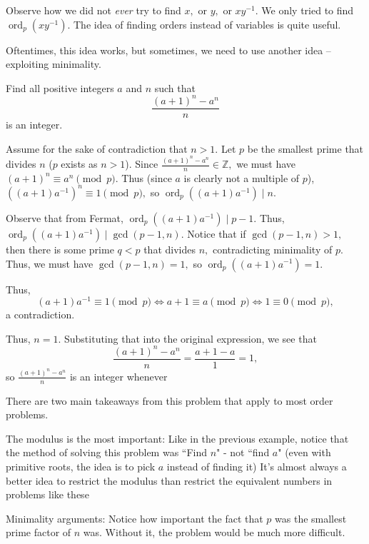 \documentclass{article}
\begin{document}
Observe how we did not \emph{ever} try to find $x,$ or $y,$ or $xy^{-1}.$ We only tried to find $\operatorname{ord}_p(xy^{-1}).$ The idea of finding orders instead of variables is quite useful.

Oftentimes, this idea works, but sometimes, we need to use another idea -- exploiting minimality.

\begin{exam}
Find all positive integers $a$ and $n$ such that $$\frac{(a+1)^n - a^n}{n}$$ is an integer.
\end{exam}

\begin{sol}
Assume for the sake of contradiction that $n>1.$ Let $p$ be the smallest prime that divides $n$ ($p$ exists as $n>1$). Since $\frac{(a+1)^n - a^n}{n} \in \mathbb{Z},$ we must have $(a+1)^{n} \equiv a^{n} \pmod{p}.$ Thus (since $a$ is clearly not a multiple of $p$), $((a+1)a^{-1})^{n} \equiv 1 \pmod{p},$ so $\operatorname{ord}_p((a+1)a^{-1}) \mid n.$

Observe that from Fermat, $\operatorname{ord}_p((a+1)a^{-1}) \mid p-1.$ Thus, $\operatorname{ord}_p((a+1)a^{-1}) \mid \gcd(p-1, n).$ Notice that if $\gcd(p-1, n) > 1,$ then there is some prime $q < p$ that divides $n,$ contradicting minimality of $p.$ Thus, we must have $\gcd(p-1, n) = 1,$ so $\operatorname{ord}_p((a+1)a^{-1}) = 1.$

Thus, $$(a+1)a^{-1} \equiv 1 \pmod{p} \Longleftrightarrow a+1 \equiv a \pmod{p} \Longleftrightarrow 1 \equiv 0 \pmod{p},$$ a contradiction.

Thus, $n = 1.$ Substituting that into the original expression, we see that $$\frac{(a+1)^n-a^n}{n} = \frac{a+1-a}{1} = 1,$$ so $\frac{(a+1)^n-a^n}{n}$ is an integer whenever 
\end{sol}

There are two main takeaways from this problem that apply to most order problems.

\begin{itemize}
\Item The modulus is the most important: Like in the previous example, notice that the method of solving this problem was ``Find $n$" - not ``find $a$" (even with primitive roots, the idea is to pick $a$ instead of finding it) It's almost always a better idea to restrict the modulus than restrict the equivalent numbers in problems like these

\Item Minimality arguments: Notice how important the fact that $p$ was the smallest prime factor of $n$ was. Without it, the problem would be much more difficult.
\end{itemize}
\end{document}
